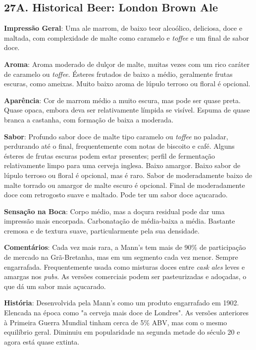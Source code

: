 \subsection*{27A. Historical Beer: London Brown Ale}
\textbf{Impressão Geral}: Uma ale marrom, de baixo teor alcoólico, deliciosa, doce e maltada, com complexidade de malte como caramelo e \textit{toffee} e um final de sabor doce.

\textbf{Aroma}: Aroma moderado de dulçor de malte, muitas vezes com um rico caráter de caramelo ou \textit{toffee}. Ésteres frutados de baixo a médio, geralmente frutas escuras, como ameixas. Muito baixo aroma de lúpulo terroso ou floral é opcional.

\textbf{Aparência}: Cor de marrom médio a muito escura, mas pode ser quase preta. Quase opaca, embora deva ser relativamente límpida se visível. Espuma de quase branca a castanha, com formação de baixa a moderada.

\textbf{Sabor}: Profundo sabor doce de malte tipo caramelo ou \textit{toffee} no paladar, perdurando até o final, frequentemente com notas de biscoito e café. Alguns ésteres de frutas escuras podem estar presentes; perfil de fermentação relativamente limpo para uma cerveja inglesa. Baixo amargor. Baixo sabor de lúpulo terroso ou floral é opcional, mas é raro. Sabor de moderadamente baixo de malte torrado ou amargor de malte escuro é opcional. Final de moderadamente doce com retrogosto suave e maltado. Pode ter um sabor doce açucarado.

\textbf{Sensação na Boca}: Corpo médio, mas a doçura residual pode dar uma impressão mais encorpada. Carbonatação de média-baixa a média. Bastante cremosa e de textura suave, particularmente pela sua densidade.

\textbf{Comentários}: Cada vez mais rara, a Mann's tem mais de 90\% de participação de mercado na Grã-Bretanha, mas em um segmento cada vez menor. Sempre engarrafada. Frequentemente usada como misturas doces entre \textit{cask ales} leves e amargas nos \textit{pubs}. As versões comerciais podem ser pasteurizadas e adoçadas, o que dá um sabor mais açucarado.

\textbf{História}: Desenvolvida pela Mann's como um produto engarrafado em 1902. Elencada na época como "a cerveja mais doce de Londres". As versões anteriores à Primeira Guerra Mundial tinham cerca de 5\% ABV, mas com o mesmo equilíbrio geral. Diminuiu em popularidade na segunda metade do século 20 e agora está quase extinta.

